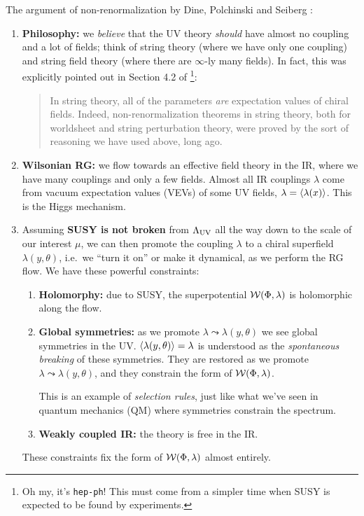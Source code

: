 \documentclass[a4paper
	,10pt
]{article}
\makeatletter
\newcommand{\nobeginpar}{\@beginparpenalty=10000}
\makeatother
\begin{document}
{\nobeginpar
	The argument of non-renormalization by Dine, Polchinski and Seiberg \cite{Seiberg:1993vc}: 
	
	\begin{enumerate}
	\item \textbf{Philosophy:} we \textit{believe} that the UV theory \textit{should} have almost no coupling and a lot of fields; think of string theory (where we have only one coupling) and string field theory (where there are $\infty$-ly many fields). In fact, this was explicitly pointed out in Section 4.2 of \mbox{\textcite{Dine:1996ui}}\footnote{
		Oh my, it's \texttt{hep-ph}! This must come from a simpler time when SUSY is expected to be found by experiments. 
	}:
	
		\begin{quote}
			In string theory, all of the parameters \textit{are} expectation values of chiral fields.
			Indeed, non-renormalization theorems in string theory, both for worldsheet and string perturbation theory, were proved by the sort of reasoning we have used above, long ago. 
		\end{quote}
	
	\item \textbf{Wilsonian RG:} we flow towards an effective field theory in the IR, where we have many couplings and only a few fields. Almost all IR couplings $\lambda$ come from vacuum expectation values (VEVs) of some UV fields, $\lambda = \langle\lambda(x)\rangle$. This is the Higgs mechanism. 
	
	\item Assuming \textbf{SUSY is not broken} from $\Lambda_{\mathrm{UV}}$ all the way down to the scale of our interest $\mu$, we can then promote the coupling $\lambda$ to a chiral superfield $\lambda(y,\theta)$, i.e.~we ``turn it on'' or make it dynamical, as we perform the RG flow. We have these powerful constraints:
	
		\begin{enumerate}
		\item \textbf{Holomorphy:} due to SUSY, the superpotential $\mathcal{W}(\Phi,\lambda)$ is holomorphic along the flow.
		
		\pagebreak[3]
		
		\item \textbf{Global symmetries:} as we promote $\lambda\leadsto\lambda(y,\theta)$ we see global symmetries in the UV. $\langle\lambda(y,\theta)\rangle = \lambda$ is understood as the \textit{spontaneous breaking} of these symmetries. They are restored as we promote $\lambda\leadsto\lambda(y,\theta)$, and they constrain the form of $\mathcal{W}(\Phi,\lambda)$. 
		
		This is an example of \textit{selection rules}, just like what we've seen in quantum mechanics (QM) where symmetries constrain the spectrum. 
		
		\item \textbf{Weakly coupled IR:} the theory is free in the IR.
		\end{enumerate}
	
	These constraints fix the form of $\mathcal{W}(\Phi,\lambda)$ almost entirely. 
	\end{enumerate}
}
	
\end{document}
